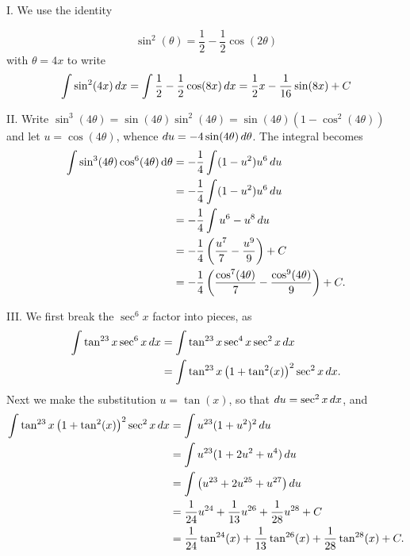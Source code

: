 \documentclass[noauthor]{ximera}
\begin{document}
\begin{freeResponse}
I. We use the identity 

\[
\sin^2(\theta) = \frac{1}{2}-\frac{1}{2} \cos(2 \theta)
\]
with $\theta = 4x$ to write 
\[
\int \sin^2(4x) \mathop{}\!d x = \int \frac{1}{2}-\frac{1}{2} \cos(8x) \mathop{}\!d x = \frac{1}{2}x-\frac{1}{16} \sin(8x)+C
\]

II. Write $\sin^3(4\theta) = \sin(4\theta) \sin^2(4\theta) = \sin(4\theta) (1-\cos^2(4\theta))$ and let $u = \cos(4\theta)$, whence $\mathop{}\!d u = -4 \sin (4\theta) \mathop{}\!d \theta$. The integral becomes
\begin{align*}
\int \sin^3 (4 \theta) \cos^6 (4\theta) \, \mathrm{d}\theta &= -\frac{1}{4} \int (1-u^2)u^6 \mathop{}\!d u \\
&= -\frac{1}{4} \int (1-u^2)u^6 \mathop{}\!d u \\
&= -\frac{1}{4} \int u^6 - u^8 \mathop{}\!d u \\
&= -\frac{1}{4}\left(\frac{u^7}{7} - \frac{u^9}{9}\right) + C \\
&= -\frac{1}{4}\left(\frac{\cos^7(4\theta)}{7} - \frac{\cos^9(4\theta)}{9}\right) + C.
\end{align*}

III. We first break the $\sec^6 x$ factor into pieces, as 
	\begin{align*}
		\int \tan^{23} x \sec^6 x \mathop{}\!d x 
		&= \int \tan^{23} x \sec^4 x \sec^2 x \mathop{}\!d x  \\
		&= \int \tan^{23} x \left( 1 + \tan^2(x) \right)^2 \sec^2 x \mathop{}\!d x .
		\end{align*}
	Next we make the substitution $u = \tan(x)$, so that $\mathop{}\!d u = \sec^2 x \mathop{}\!d x$, and
		\begin{align*}
		\int \tan^{23} x \left( 1 + \tan^2(x) \right)^2 \sec^2 x \mathop{}\!d x
		&= \int u^{23} (1+u^2)^2 \mathop{}\!d u  \\
		&= \int u^{23} (1 + 2u^2 + u^4) \mathop{}\!d u  \\
		&= \int \left( u^{23} + 2u^{25} + u^{27} \right) \mathop{}\!d u  \\
		&= \frac{1}{24} u^{24} + \frac{1}{13} u^{26} + \frac{1}{28} u^{28} + C  \\
		&= \frac{1}{24} \tan^{24}(x) + \frac{1}{13} \tan^{26}(x) + \frac{1}{28} \tan^{28}(x) + C.
		\end{align*}
		

\end{freeResponse}
\end{document}
